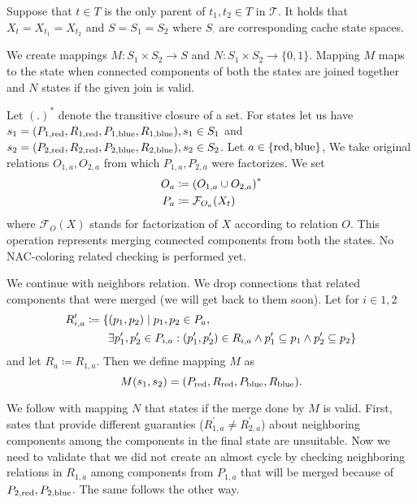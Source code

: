 Suppose that \( t \in T \) is
the only parent of \( t_1, t_2 \in T \) in \( \mathcal {T} \).
It holds that \( X_t = X_{t_1} = X_{t_2} \)
and \( S = S_1 = S_2 \) where \( S_\cdot \) are corresponding cache state spaces.

We create mappings \( M: S_1 \times S_2 \to S \) and \( N: S_1 \times S_2 \to \{0, 1\} \).
Mapping \( M \) maps to the state when connected components of both the states
are joined together and \( N \) states if the given join is valid.

Let \( {(.)}^* \) denote the transitive closure of a set.
For states let us have
\( s_1 = (P_{1,\text{red}}, R_{1,\text{red}}, P_{1,\text{blue}}, R_{1,\text{blue}}), s_1 \in S_1 \) and
\( s_2 = (P_{2,\text{red}}, R_{2,\text{red}}, P_{2,\text{blue}}, R_{2,\text{blue}}), s_2 \in S_2 \).
Let \( a \in \{\text{red}, \text{blue}\} \),
We take original relations \( O_{1, a}, O_{2, a} \)
from which \( P_{1, a}, P_{2, a} \) were factorizes.
We set
%
\begin{align}
	O_a & \coloneqq {(O_{1, a} \cup O_{2, a})}^*   \notag \\
	P_a & \coloneqq \mathcal{F}_{O_a}(X_t)
\end{align}
%
where \( \mathcal{F}_O(X) \) stands for factorization of \( X \)
according to relation \( O \). This operation represents merging connected
components from both the states. No NAC-coloring related checking is performed yet.

We continue with neighbors relation. We drop connections that related components
that were merged (we will get back to them soon).
Let for \( i \in {1, 2} \)
%
\begin{align}
	R_{i,a}^\prime & \coloneqq \{(p_1, p_2) \mid p_1, p_2 \in P_a,   \notag                                                                                                            \\
	               & \qquad \exists p_1^\prime, p_2^\prime \in P_{i,a} : (p_1^\prime, p_2^\prime) \in R_{i,a} \land p_1^\prime \subseteq p_1 \land p_2^\prime \subseteq p_2\}   \notag
\end{align}
%
and \WLOG{} let \( R_a \coloneqq R_{1,a} \).
Then we define mapping \( M \) as \[ M(s_1, s_2) = (P_{\text{red}}, R_{\text{red}}, P_{\text{blue}}, R_{\text{blue}}). \]

We follow with mapping \( N \) that states if the merge done by \( M \) is valid.
First, sates that provide different guaranties
(\( R_{1,a}^\prime \not= R_{2,a}^\prime \)) about neighboring components
among the components in the final state are unsuitable.
Now we need to validate that we did not create an almost cycle by checking
neighboring relations in \( R_{1,a} \) among components from \( P_{1,a} \)
that will be merged because of \( P_{2,\text{red}}, P_{2,\text{blue}} \).
The same follows the other way.

